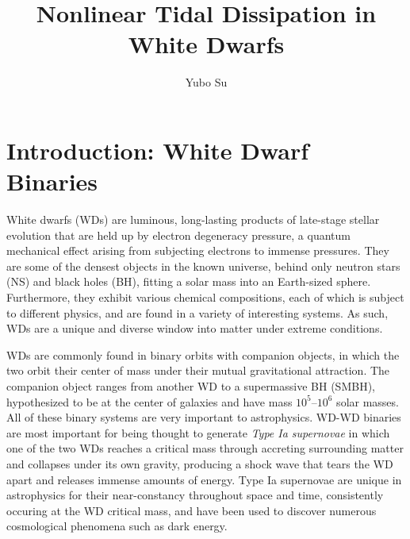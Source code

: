 \documentclass[11pt,
        usenames, %
        dvipsnames %
    ]{article}
\begin{document}
\def\Snospace~{\S{}} %
\renewcommand*{\sectionautorefname}{\Snospace}
\renewcommand*{\appendixautorefname}{\Snospace}
\renewcommand*{\figureautorefname}{Fig.}
\renewcommand*{\equationautorefname}{Eq.}
\renewcommand*{\tableautorefname}{Tab.}

\onehalfspacing


\title{Nonlinear Tidal Dissipation in White Dwarfs}
\author{Yubo Su}
\date{}

\maketitle

\section{Introduction: White Dwarf Binaries}

White dwarfs (WDs) are luminous, long-lasting products of late-stage stellar
evolution that are held up by electron degeneracy pressure, a quantum mechanical
effect arising from subjecting electrons to immense pressures. They are some of
the densest objects in the known universe, behind only neutron stars (NS) and
black holes (BH), fitting a solar mass into an Earth-sized sphere. Furthermore,
they exhibit various chemical compositions, each of which is subject to
different physics, and are found in a variety of interesting systems. As such,
WDs are a unique and diverse window into matter under extreme conditions.

WDs are commonly found in binary orbits with companion objects, in which the two
orbit their center of mass under their mutual gravitational attraction. The
companion object ranges from another WD to a supermassive BH (SMBH),
hypothesized to be at the center of galaxies and have mass $10^5$--$10^6$ solar
masses. All of these binary systems are very important to astrophysics. WD-WD
binaries are most important for being thought to generate \emph{Type Ia
supernovae} in which one of the two WDs reaches a critical mass through
accreting surrounding matter and collapses under its own gravity, producing a
shock wave that tears the WD apart and releases immense amounts of energy. Type
Ia supernovae are unique in astrophysics for their near-constancy throughout
space and time, consistently occuring at the WD critical mass, and have been
used to discover numerous cosmological phenomena such as dark energy.
\end{document}
